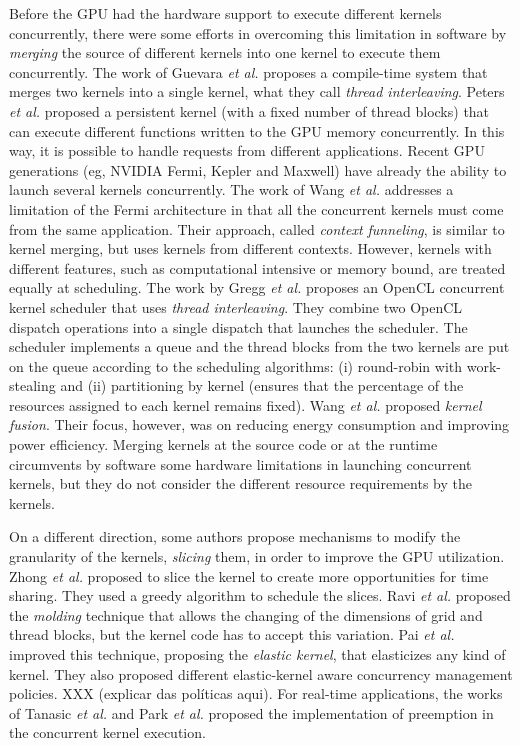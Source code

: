 \documentclass[conference]{IEEEtran}
\begin{document}
Before the GPU had the hardware support to execute different kernels concurrently, there were some efforts in overcoming this limitation in software by \textit{merging} the source of different kernels into one kernel to execute them concurrently.  The work of Guevara \textit{et al.} \cite{guevara2009enabling}  proposes a compile-time system that merges two kernels into a single kernel, what they call \textit{thread interleaving}. Peters \textit{et al.} \cite{peters2010efficiently} proposed a persistent kernel (with a fixed number of thread blocks) that can execute different functions written to the GPU memory concurrently. In this way, it is possible to handle requests from different applications. Recent GPU generations (eg, NVIDIA Fermi, Kepler and Maxwell) have already the ability to launch several kernels concurrently. The work of Wang \textit{et al.} \cite{wang2011exploiting}  addresses a limitation of the Fermi architecture in that all the concurrent kernels must come from the same application. Their approach, called \textit{context funneling}, is similar to kernel merging, but uses kernels from different contexts. However, kernels with different features, such as computational intensive or memory bound, are treated equally at scheduling. The work by Gregg \textit{et al.} \cite{gregg2012fine} proposes an OpenCL concurrent kernel scheduler that uses \textit{thread interleaving}. They combine two OpenCL dispatch operations into a single dispatch that launches the scheduler. The scheduler implements a queue and the thread blocks from the two kernels are put on the queue according to the scheduling algorithms: (i) round-robin with work-stealing and (ii) partitioning by kernel (ensures that the percentage of the resources assigned to each kernel remains fixed). Wang \textit{et al.} \cite{wang2010kernel} proposed \textit{kernel fusion}. Their focus, however, was on reducing energy consumption and improving power efficiency. Merging kernels at the source code or at the runtime circumvents by software some hardware limitations in launching concurrent kernels, but they do not consider the different resource requirements by the kernels.

On a different direction, some authors propose mechanisms to modify the granularity of the kernels, {\it slicing} them, in order to improve the GPU utilization. Zhong \textit{et al.} \cite{zhong2014kernelet} proposed to slice the kernel to create more opportunities for time sharing. They used a greedy algorithm to schedule the slices. Ravi \textit{et al.} \cite{ravi2011supporting} proposed the \textit{molding} technique that allows the changing of the dimensions of grid and thread blocks, but the kernel code has to accept this variation. Pai \textit{et al.} \cite{pai2013improving} improved this technique, proposing the \textit{elastic kernel}, that elasticizes any kind of kernel. They also proposed different elastic-kernel aware concurrency management policies. XXX (explicar das políticas aqui). For real-time applications, the works of Tanasic  \textit{et al.} \cite{tanasic2014enabling} and Park \textit{et al.} \cite{park2015chimera} proposed the implementation of preemption in the concurrent kernel execution.
\end{document}
